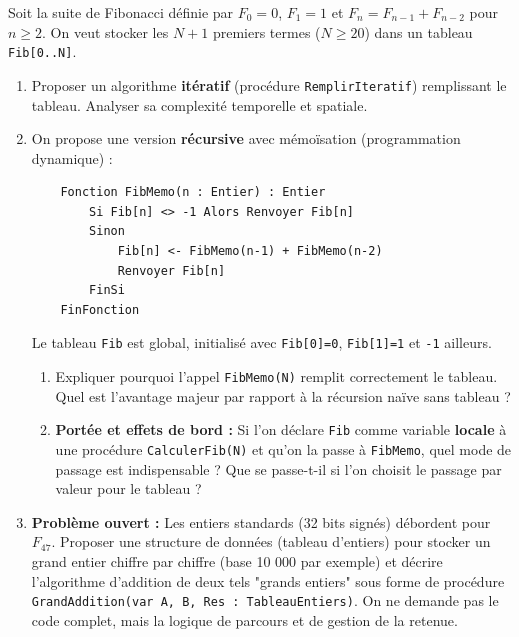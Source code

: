 \documentclass[11pt]{article}
\begin{document}
\begin{exercice}
Soit la suite de Fibonacci définie par $F_0 = 0$, $F_1 = 1$ et $F_n = F_{n-1} + F_{n-2}$ pour $n \ge 2$. On veut stocker les $N+1$ premiers termes ($N \ge 20$) dans un tableau \texttt{Fib[0..N]}.
\begin{enumerate}
    \item Proposer un algorithme \textbf{itératif} (procédure \texttt{RemplirIteratif}) remplissant le tableau. Analyser sa complexité temporelle et spatiale.
    \item On propose une version \textbf{récursive} avec mémoïsation (programmation dynamique) :
    \begin{verbatim}
    Fonction FibMemo(n : Entier) : Entier
        Si Fib[n] <> -1 Alors Renvoyer Fib[n]
        Sinon
            Fib[n] <- FibMemo(n-1) + FibMemo(n-2)
            Renvoyer Fib[n]
        FinSi
    FinFonction
    \end{verbatim}
    Le tableau \texttt{Fib} est global, initialisé avec \texttt{Fib[0]=0}, \texttt{Fib[1]=1} et \texttt{-1} ailleurs.
    \begin{enumerate}
        \item Expliquer pourquoi l'appel \texttt{FibMemo(N)} remplit correctement le tableau. Quel est l'avantage majeur par rapport à la récursion naïve sans tableau ?
        \item \textbf{Portée et effets de bord :} Si l'on déclare \texttt{Fib} comme variable \textbf{locale} à une procédure \texttt{CalculerFib(N)} et qu'on la passe à \texttt{FibMemo}, quel mode de passage est indispensable ? Que se passe-t-il si l'on choisit le passage par valeur pour le tableau ?
    \end{enumerate}
    \item \textbf{Problème ouvert :} Les entiers standards (32 bits signés) débordent pour $F_{47}$. Proposer une structure de données (tableau d'entiers) pour stocker un grand entier chiffre par chiffre (base 10 000 par exemple) et décrire l'algorithme d'addition de deux tels "grands entiers" sous forme de procédure \texttt{GrandAddition(var A, B, Res : TableauEntiers)}. On ne demande pas le code complet, mais la logique de parcours et de gestion de la retenue.
\end{enumerate}
\end{exercice}
\end{document}
